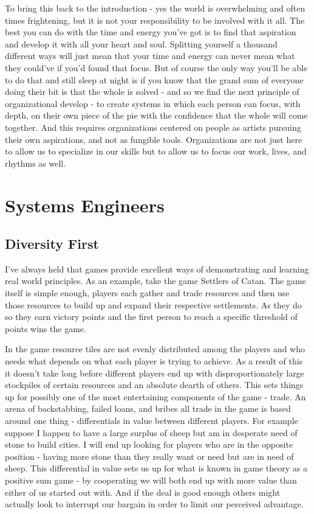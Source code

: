 \documentclass[11pt,a5paper]{book}
\begin{document}
To bring this back to the introduction - yes the world is overwhelming and often times frightening, but it is not your responsibility to be involved with it all. The best you can do with the time and energy you've got is to find that aspiration and develop it with all your heart and soul. Splitting yourself a thousand different ways will just mean that your time and energy can never mean what they could've if you'd found that focus. But of course the only way you'll be able to do that and still sleep at night is if you know that the grand sum of everyone doing their bit is that the whole is solved - and so we find the next principle of organizational develop - to create systems in which each person can focus, with depth, on their own piece of the pie with the confidence that the whole will come together. And this requires organizations centered on people as artists pursuing their own aspirations, and not as fungible tools. Organizations are not just here to allow us to specialize in our skills but to allow us to focus our work, lives, and rhythms as well.

\chapter{Systems Engineers}
\section{Diversity First}
I've always held that games provide excellent ways of demonstrating and learning real world principles. As an example, take the game Settlers of Catan. The game itself is simple enough, players each gather and trade resources and then use those resources to build up and expand their respective settlements. As they do so they earn victory points and the first person to reach a specific threshold of points wins the game. 
\newline

In the game resource tiles are not evenly distributed among the players and who needs what depends on what each player is trying to achieve. As a result of this it doesn't take long before different players end up with disproportionately large stockpiles of certain resources and an absolute dearth of others. This sets things up for possibly one of the most entertaining components of the game - trade. An arena of backstabbing, failed loans, and bribes all trade in the game is based around one thing - differentials in value between different players. For example suppose I happen to have a large surplus of sheep but am in desperate need of stone to build cities. I will end up looking for players who are in the opposite position - having more stone than they really want or need but are in need of sheep. This differential in value sets us up for what is known in game theory as a positive sum game - by cooperating we will both end up with more value than either of us started out with. And if the deal is good enough others might actually look to interrupt our bargain in order to limit our perceived advantage. 
\newline
\end{document}
